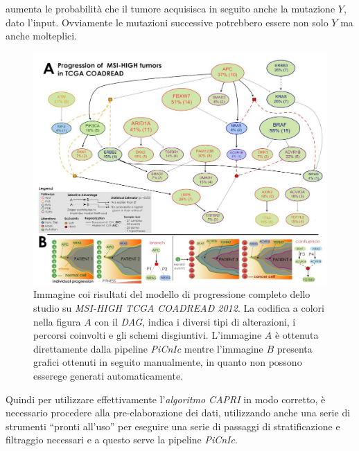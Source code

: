 \documentclass[a4paper,12pt, oneside]{book}
\begin{document}
aumenta le probabilità che il tumore acquisisca in seguito anche la mutazione
$Y$, dato l'input. Ovviamente le mutazioni successive potrebbero essere non
solo $Y$ ma anche molteplici.
\begin{figure}
  \centering
  \includegraphics[scale = 0.28]{img/resc.jpg}
  \caption{Immagine coi risultati del modello di progressione completo dello
    studio su \textit{MSI-HIGH TCGA COADREAD 2012}. La codifica a colori nella
    figura $A$ con il \textit{DAG}, indica
    i diversi tipi di alterazioni, i percorsi coinvolti e gli schemi
    disgiuntivi. L'immagine $A$ è ottenuta direttamente dalla pipeline
    \textit{PiCnIc} mentre l'immagine $B$ presenta grafici ottenuti in seguito
    manualmente, in quanto non possono esserege generati automaticamente. }
\end{figure}
Quindi per utilizzare effettivamente l'\textit{algoritmo CAPRI} in modo
corretto, è necessario procedere alla pre-elaborazione dei dati, utilizzando
anche una serie di strumenti ``pronti all'uso'' per eseguire una serie di
passaggi di stratificazione e filtraggio necessari e a questo serve la pipeline
\textit{PiCnIc}.  
\end{document}

